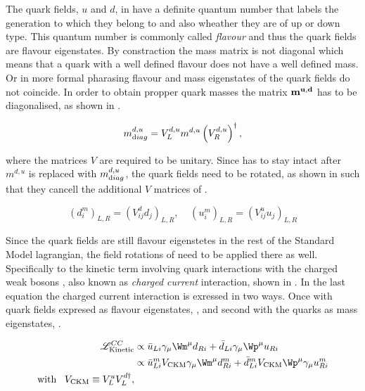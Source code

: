 The quark fields, $u$ and $d$,  in  have a definite quantum number that labels the generation to which they belong
to and also wheather they are of up or down type. This quantum number is commonly called {\it flavour} and thus the quark fields
are flavour eigenstates. By constraction the mass matrix is not diagonal which means that
a quark with a well defined flavour does not have a well defined mass. Or in more formal pharasing flavour and mass eigenstates of
the quark fields do not coincide. In order to obtain propper quark masses the matrix $\bf m^{u,d}$ has to be diagonalised, as shown in .

\begin{equation}
  m^{d,u}_{\text diag} = V_L^{d,u} m^{d,u} \left(V_R^{d,u}\right)^{\dagger},
  \label{diagM}
\end{equation}

\noindent where the matrices $V$ are required to be unitary. Since  has to stay intact after $m^{d,u}$ is replaced with
$m^{d,u}_{\text diag}$, the quark fields need to be rotated, as shown in  such that they cancell the additional $V$ matrices
of .

\begin{equation}
  \left( d_{i}^m \right)_{L,R} = \left( V^d_{ij} d_{j} \right)_{L,R}, \;\;\;\; \left( u_{i}^m \right)_{L,R} = \left( V^u_{ij} u_{j} \right)_{L,R}
  \label{quark_rotation}
\end{equation}

\noindent Since the quark fields are still flavour eigenstetes in the rest of the Standard Model lagrangian,
the field rotations of  need to be applied there as well. Specifically
to the kinetic term involving quark interactions with the charged weak bosons \Wpm, also known as {\it charged current}
interaction, shown in . In the last equation the charged current interaction is exressed in two ways.
Once with quark fields expresed as flavour eigenstates, , and second with the quarks as mass eigenstates, .

\begin{subequations}
  \label{CClagrangian}
  \begin{align}
    \mathscr{L}_{\text{Kinetic}}^{CC} & \propto \bar{u}_{Li} \gamma_\mu {\Wm}^\mu d_{Ri} + \bar{d}_{Li} \gamma_\mu {\Wp}^\mu u_{Ri}  \label{CClagrangianInt} \\
                                      & \propto \bar{u}_{Li}^m  {V_{\text{CKM}}} \gamma_\mu {\Wm}^\mu d_{Ri}^m + \bar{d}_{Li}^m V_{\text{CKM}} {\Wp}^\mu \gamma_\mu u_{Ri}^m \label{CClagrangianMass} \\
                                      \text{with} \;\;\; V_{\text{CKM}} \equiv V^u_LV^{d\dagger}_L, & \nonumber
  \end{align}
\end{subequations}


